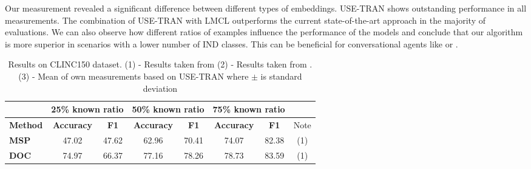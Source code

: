\documentclass[runningheads]{llncs}
\begin{document}
Our measurement revealed a significant difference between different types of embeddings. USE-TRAN shows outstanding performance in all measurements. The combination of USE-TRAN with LMCL outperforms the current state-of-the-art approach in the majority of evaluations. We can also observe how different ratios of examples influence the performance of the models and conclude that our algorithm is more superior in scenarios with a lower number of IND classes. This can be beneficial for conversational agents like \cite{finch2020emora} or \cite{pichl2020alquist}.

\begin{table}[t]
\caption{Results on CLINC150 dataset. (1) - Results taken from \cite{zhang2021adaptive_decision_boundary} (2) - Results taken from \cite{odist}. (3) - Mean of own measurements based on USE-TRAN where $\pm$ is standard deviation}
\label{tab:clinc_result}
\centering
\begin{adjustbox}{width=1\textwidth}
\begin{tabular}{l|cc|cc|cc|c}
                            & \multicolumn{2}{c|}{25\% known ratio}                                                                                          & \multicolumn{2}{c|}{50\% known ratio}                                                                                          & \multicolumn{2}{c|}{75\% known ratio}                                                                                          &      \\ \hline
\textbf{Method}             & \multicolumn{1}{c}{\textbf{Accuracy}} & \multicolumn{1}{c|}{\textbf{F1}} & \multicolumn{1}{c}{\textbf{Accuracy}} & \multicolumn{1}{c|}{\textbf{F1}} & \multicolumn{1}{c}{\textbf{Accuracy}} & \multicolumn{1}{c|}{\textbf{F1}} & Note \\ \hline
\textbf{MSP}                & 47.02                                 & 47.62                                                                                  & 62.96                                 & 70.41                                                                                  & 74.07                                 & 82.38                                                                                  & (1)  \\
\textbf{DOC}                & 74.97                                 & 66.37                                                                                  & 77.16                                 & 78.26                                                                                  & 78.73                                 & 83.59                                                                                  & (1)  \\

\end{tabular}
\end{adjustbox}
\end{table}
\end{document}
